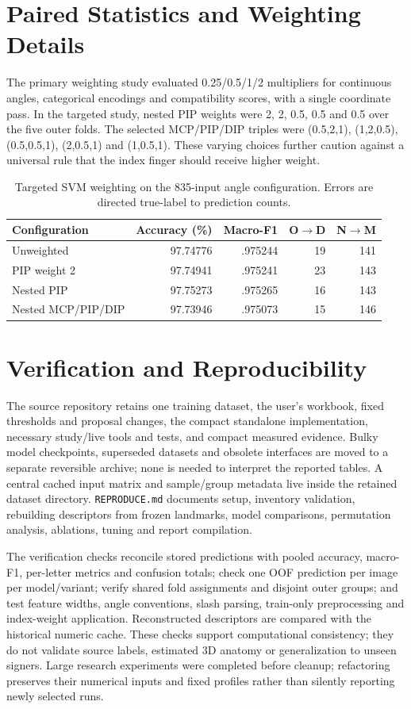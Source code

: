 \documentclass{article}
\begin{document}
\clearpage
\section{Paired Statistics and Weighting Details}\label{app:statistics}

The primary weighting study evaluated 0.25/0.5/1/2 multipliers for continuous angles, categorical encodings and compatibility scores, with a single coordinate pass. In the targeted study, nested PIP weights were 2, 2, 0.5, 0.5 and 0.5 over the five outer folds. The selected MCP/PIP/DIP triples were (0.5,2,1), (1,2,0.5), (0.5,0.5,1), (2,0.5,1) and (1,0.5,1). These varying choices further caution against a universal rule that the index finger should receive higher weight.

\begin{table}[h]\centering\caption{Targeted SVM weighting on the 835-input angle configuration. Errors are directed true-label to prediction counts.}\begin{tabular}{lrrrr}\toprule
Configuration & Accuracy (\%) & Macro-F1 & O$\to$D & N$\to$M\\\midrule
Unweighted & 97.74776 & .975244 & 19 & 141\\
PIP weight 2 & 97.74941 & .975241 & 23 & 143\\
Nested PIP & 97.75273 & .975265 & 16 & 143\\
Nested MCP/PIP/DIP & 97.73946 & .975073 & 15 & 146\\\bottomrule\end{tabular}\end{table}

\section{Verification and Reproducibility}\label{app:verification}
The source repository retains one training dataset, the user's workbook, fixed thresholds and proposal changes, the compact standalone implementation, necessary study/live tools and tests, and compact measured evidence. Bulky model checkpoints, superseded datasets and obsolete interfaces are moved to a separate reversible archive; none is needed to interpret the reported tables. A central cached input matrix and sample/group metadata live inside the retained dataset directory. \texttt{REPRODUCE.md} documents setup, inventory validation, rebuilding descriptors from frozen landmarks, model comparisons, permutation analysis, ablations, tuning and report compilation.

The verification checks reconcile stored predictions with pooled accuracy, macro-F1, per-letter metrics and confusion totals; check one OOF prediction per image per model/variant; verify shared fold assignments and disjoint outer groups; and test feature widths, angle conventions, slash parsing, train-only preprocessing and index-weight application. Reconstructed descriptors are compared with the historical numeric cache. These checks support computational consistency; they do not validate source labels, estimated 3D anatomy or generalization to unseen signers. Large research experiments were completed before cleanup; refactoring preserves their numerical inputs and fixed profiles rather than silently reporting newly selected runs.
\end{document}
